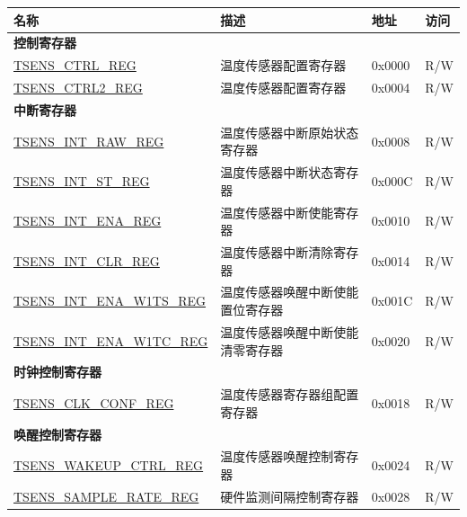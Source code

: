 \begin{longtable}{|p{6cm}|p{7.2cm}|p{1.3cm}|p{1cm}|}
\hline\rowcolor{lightgray}
\textbf{名称} & \textbf{描述} & \textbf{地址} & \textbf{访问} \\ \hline
\endhead

\multicolumn{4}{|l|}{\textbf{控制寄存器}} \\ \hline
\hyperref[regdesc:TSENSCTRLREG]{TSENS\_CTRL\_REG}   & 温度传感器配置寄存器  & 0x0000 & R/W  \\ \hline
\hyperref[regdesc:TSENSCTRL2REG]{TSENS\_CTRL2\_REG} & 温度传感器配置寄存器  & 0x0004 & R/W    \\ \hline

\multicolumn{4}{|l|}{\textbf{中断寄存器}} \\ \hline
\hyperref[regdesc:TSENSINTRAWREG]{TSENS\_INT\_RAW\_REG}       & 温度传感器中断原始状态寄存器      & 0x0008 & R/W  \\ \hline
\hyperref[regdesc:TSENSINTSTREG]{TSENS\_INT\_ST\_REG}         & 温度传感器中断状态寄存器   & 0x000C & R/W        \\ \hline
\hyperref[regdesc:TSENSINTENAREG]{TSENS\_INT\_ENA\_REG}       & 温度传感器中断使能寄存器   & 0x0010 & R/W     \\ \hline
\hyperref[regdesc:TSENSINTCLRREG]{TSENS\_INT\_CLR\_REG}       & 温度传感器中断清除寄存器    & 0x0014 & R/W        \\ \hline
\hyperref[regdesc:TSENSINTENAW1TSREG]{TSENS\_INT\_ENA\_W1TS\_REG} & 温度传感器唤醒中断使能置位寄存器   & 0x001C & R/W  \\ \hline
\hyperref[regdesc:TSENSINTENAW1TCREG]{TSENS\_INT\_ENA\_W1TC\_REG} & 温度传感器唤醒中断使能清零寄存器 & 0x0020 & R/W  \\ \hline

\multicolumn{4}{|l|}{\textbf{时钟控制寄存器}} \\ \hline
\hyperref[regdesc:TSENSCLKCONFREG]{TSENS\_CLK\_CONF\_REG} & 温度传感器寄存器组配置寄存器 & 0x0018 & R/W \\ \hline

\multicolumn{4}{|l|}{\textbf{唤醒控制寄存器}} \\ \hline
\hyperref[regdesc:TSENSWAKEUPCTRLREG]{TSENS\_WAKEUP\_CTRL\_REG} & 温度传感器唤醒控制寄存器   & 0x0024 & R/W  \\ \hline
\hyperref[regdesc:TSENSSAMPLERATEREG]{TSENS\_SAMPLE\_RATE\_REG} & 硬件监测间隔控制寄存器 & 0x0028 & R/W \\ \hline

\end{longtable}